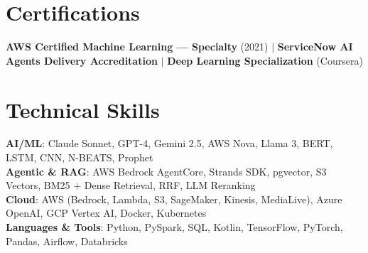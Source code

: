 \documentclass[letterpaper,10pt]{article}
\begin{document}
\section{Certifications}
 \begin{itemize}[leftmargin=0.15in, label={}]
    \small{\item{
     \textbf{AWS Certified Machine Learning --- Specialty} (2021) $|$
     \textbf{ServiceNow AI Agents Delivery Accreditation} $|$
     \textbf{Deep Learning Specialization} (Coursera)
    }}
 \end{itemize}


\section{Technical Skills}
 \begin{itemize}[leftmargin=0.15in, label={}]
    \small{\item{
     \textbf{AI/ML}{: Claude Sonnet, GPT-4, Gemini 2.5, AWS Nova, Llama 3, BERT, LSTM, CNN, N-BEATS, Prophet} \\
     \textbf{Agentic \& RAG}{: AWS Bedrock AgentCore, Strands SDK, pgvector, S3 Vectors, BM25 + Dense Retrieval, RRF, LLM Reranking} \\
     \textbf{Cloud}{: AWS (Bedrock, Lambda, S3, SageMaker, Kinesis, MediaLive), Azure OpenAI, GCP Vertex AI, Docker, Kubernetes} \\
     \textbf{Languages \& Tools}{: Python, PySpark, SQL, Kotlin, TensorFlow, PyTorch, Pandas, Airflow, Databricks}
    }}
 \end{itemize}


\end{document}
